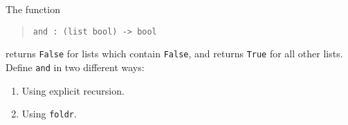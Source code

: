 \begin{questions}
\begin{subquestions}
		\subquestion 

The function
\begin{quote}
\verb"and : (list bool) -> bool"
\end{quote}
returns \verb"False" for lists
which contain \verb"False", and returns \verb"True" for all other lists.
Define \verb"and" in two different ways:
\begin{enumerate}
 \item Using explicit recursion.
 \item Using \verb"foldr".
\end{enumerate}

	\end{subquestions}

\end{questions}






